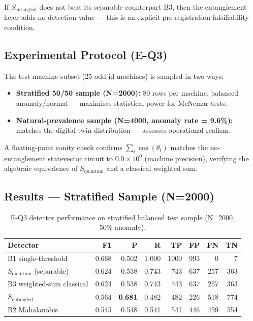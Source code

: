 If $S_{\text{entangled}}$ does not beat its separable counterpart B3, then the entanglement layer adds no detection value --- this is an explicit pre-registration falsifiability condition.

\subsection{Experimental Protocol (E-Q3)}

The test-machine subset (25 odd-id machines) is sampled in two ways:

\begin{itemize}
    \item \textbf{Stratified 50/50 sample (N=2000):} 80 rows per machine, balanced anomaly/normal --- maximises statistical power for McNemar tests.
    \item \textbf{Natural-prevalence sample (N=4000, anomaly rate = 9.6\%):} matches the digital-twin distribution --- assesses operational realism.
\end{itemize}

A floating-point sanity check confirms $\sum_i \cos(\theta_i)$ matches the no-entanglement statevector circuit to $0.0 \times 10^{0}$ (machine precision), verifying the algebraic equivalence of $S_{\text{quantum}}$ and a classical weighted sum.

\subsection{Results --- Stratified Sample (N=2000)}

\begin{table}[h!]
\centering
\caption{E-Q3 detector performance on stratified balanced test sample (N=2000, 50\% anomaly).}
\label{tab:eq3_stratified}
\begin{tabular}{lrrrrrrr}
\hline
\textbf{Detector} & \textbf{F1} & \textbf{P} & \textbf{R} & \textbf{TP} & \textbf{FP} & \textbf{FN} & \textbf{TN} \\
\hline
B1 single-threshold       & 0.668 & 0.502 & 1.000 & 1000 & 993 &   0 &   7 \\
$S_{\text{quantum}}$ (separable) & 0.624 & 0.538 & 0.743 &  743 & 637 & 257 & 363 \\
B3 weighted-sum classical & 0.624 & 0.538 & 0.743 &  743 & 637 & 257 & 363 \\
$S_{\text{entangled}}$    & 0.564 & \textbf{0.681} & 0.482 &  482 & 226 & 518 & 774 \\
B2 Mahalanobis            & 0.545 & 0.548 & 0.541 &  541 & 446 & 459 & 554 \\
\hline
\end{tabular}
\end{table}

